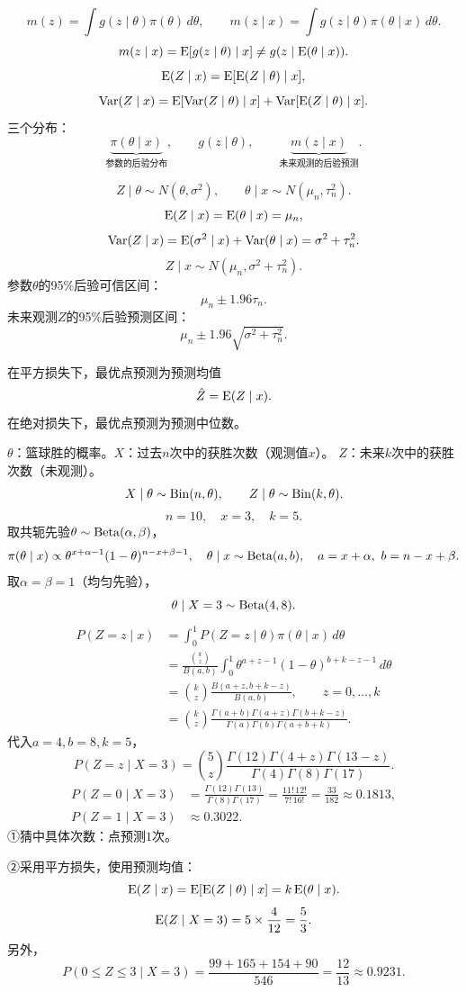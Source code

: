 \[
m(z)=\int g(z\mid\theta)\pi(\theta)\,d\theta,\qquad
m(z\mid x)=\int g(z\mid\theta)\pi(\theta\mid x)\,d\theta.
\]
\[
m(z\mid x)=\operatorname{E}[g(z\mid\theta)\mid x]
\ne g(z\mid\operatorname{E}(\theta\mid x)).
\]
\[
\operatorname{E}(Z\mid x)=\operatorname{E}[\operatorname{E}(Z\mid\theta)\mid x],
\]
\[
\operatorname{Var}(Z\mid x)=
\operatorname{E}[\operatorname{Var}(Z\mid\theta)\mid x]+\operatorname{Var}[\operatorname{E}(Z\mid\theta)\mid x].
\]
三个分布：
\[
\underbrace{\pi(\theta\mid x)}_{\text{参数的后验分布}},\qquad
g(z\mid\theta),\qquad
\underbrace{m(z\mid x)}_{\text{未来观测的后验预测}}.
\]

\[
Z\mid\theta\sim N(\theta,\sigma^2),\qquad
\theta\mid x\sim N(\mu_n,\tau_n^2).
\]
\[
\operatorname{E}(Z\mid x)=\operatorname{E}(\theta\mid x)=\mu_n,
\]
\[
\operatorname{Var}(Z\mid x)=\operatorname{E}(\sigma^2\mid x)+\operatorname{Var}(\theta\mid x)
=\sigma^2+\tau_n^2.
\]
\[
Z\mid x\sim N(\mu_n,\sigma^2+\tau_n^2).
\]
参数$\theta$的95\%后验可信区间：
\[
\mu_n\pm1.96\tau_n.
\]
未来观测$Z$的95\%后验预测区间：
\[
\mu_n\pm1.96\sqrt{\sigma^2+\tau_n^2}.
\]
\begin{center}
\end{center}
在平方损失下，最优点预测为预测均值
\[
\hat Z=\operatorname{E}(Z\mid x).
\]
在绝对损失下，最优点预测为预测中位数。

$\theta$：篮球胜的概率。$X$：过去$n$次中的获胜次数（观测值$x$）。
$Z$：未来$k$次中的获胜次数（未观测）。
\[
X\mid\theta\sim\operatorname{Bin}(n,\theta),\qquad
Z\mid\theta\sim\operatorname{Bin}(k,\theta).
\]
\[
n=10,\quad x=3,\quad k=5.
\]
取共轭先验$\theta\sim\operatorname{Beta}(\alpha,\beta)$，
\[
\pi(\theta\mid x)\propto
\theta^{x+\alpha-1}(1-\theta)^{n-x+\beta-1},
\quad \theta\mid x\sim\operatorname{Beta}(a,b),
\quad a=x+\alpha,\ b=n-x+\beta.
\]
取$\alpha=\beta=1$（均匀先验），
\[
\theta\mid X=3\sim\operatorname{Beta}(4,8).
\]
\begin{align*}
P(Z=z\mid x)
&=\int_0^1P(Z=z\mid\theta)\pi(\theta\mid x)\,d\theta\\
&=\frac{\binom kz}{B(a,b)}
\int_0^1\theta^{a+z-1}(1-\theta)^{b+k-z-1}\,d\theta\\
&=\binom kz\frac{B(a+z,b+k-z)}{B(a,b)},\qquad z=0,\ldots,k\\
&=\binom kz
\frac{\Gamma(a+b)\Gamma(a+z)\Gamma(b+k-z)}
{\Gamma(a)\Gamma(b)\Gamma(a+b+k)}.
\end{align*}
代入$a=4,b=8,k=5$，
\[
P(Z=z\mid X=3)=\binom5z
\frac{\Gamma(12)\Gamma(4+z)\Gamma(13-z)}
{\Gamma(4)\Gamma(8)\Gamma(17)}.
\]
\begin{align*}
P(Z=0\mid X=3)
&=\frac{\Gamma(12)\Gamma(13)}{\Gamma(8)\Gamma(17)}
=\frac{11!\,12!}{7!\,16!}
=\frac{33}{182}\approx0.1813,\\
P(Z=1\mid X=3)&\approx0.3022.
\end{align*}
①猜中具体次数：点预测$1$次。

②采用平方损失，使用预测均值：
\[
\operatorname{E}(Z\mid x)=\operatorname{E}[\operatorname{E}(Z\mid\theta)\mid x]=k\operatorname{E}(\theta\mid x).
\]
\[
\operatorname{E}(Z\mid X=3)=5\times\frac4{12}=\frac53.
\]
另外，
\[
P(0\leq Z\leq3\mid X=3)
=\frac{99+165+154+90}{546}
=\frac{12}{13}\approx0.9231.
\]
